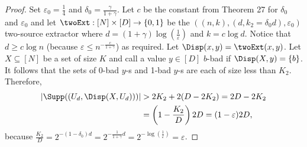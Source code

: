 \begin{proof}
Set $\varepsilon_0=\frac14$ and $\delta_0=\frac\gamma{1+\gamma}$. Let $c$ be the constant from Theorem 27 for $\delta_0$ and $\varepsilon_0$ and let $\twoExt:[N]\times[D]\to\{0,1\}$ be the $((n,k),(d,k_2=\delta_0d),\varepsilon_0)$ two-source extractor where $d=(1+\gamma)\log(\frac1\varepsilon)$ and $k=c\log d$. Notice that $d\ge c\log n$ (because $\varepsilon\le n^{-\frac c{1+\gamma}}$) as required. Let $\Disp(x,y)=\twoExt(x,y)$.
Let $X\subseteq[N]$ be a set of size $K$ and call a value $y\in[D]$ $b$-bad if $\Disp(X,y)=\{b\}$. It follows that the sets of 0-bad $y$-s and 1-bad $y$-s are each of size less than $K_2$. Therefore,
\begin{align*}
|\Supp((U_d,\Disp(X,U_d)))|&>2K_2+2(D-2K_2)=2D-2K_2\\
&=\left(1-\frac{K_2}D\right)2D=(1-\varepsilon)2D,
\end{align*}
because $\frac{K_2}D=2^{-(1-\delta_0)d}=2^{-\frac1{1+\gamma}d}=2^{-\log(\frac1\varepsilon)}=\varepsilon$.
\end{proof}
